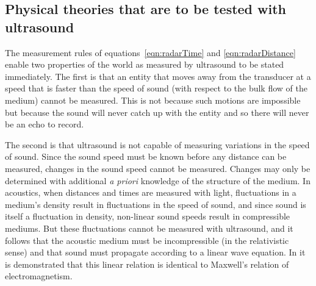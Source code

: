 \subsection{Physical theories  that are to be tested with ultrasound}

The measurement rules of equations~\ref{eqn:radarTime} and \ref{eqn:radarDistance} enable two properties of the world as measured by ultrasound to be stated immediately.
The first is that an entity that moves away from the transducer at a speed that is faster than the speed of sound (with respect to the bulk flow of the medium) 
cannot be measured.  
This is not because such motions are impossible but because the sound will never catch  up with the entity and so there will never be an echo to record.

The second is that ultrasound is not capable of  measuring variations in the speed of sound.
Since the sound speed must be known before any distance can be measured,
changes in the sound speed  cannot be measured. 
Changes may only be determined  with additional {\em a priori} knowledge of the structure of the medium. 
In acoustics, when distances and times are measured with light,
fluctuations in a medium's density result in fluctuations in the speed of sound,
and since sound is itself a fluctuation in density, 
non-linear sound speeds result in compressible mediums.
But these fluctuations cannot be measured with ultrasound,
and it follows that the acoustic medium must be incompressible (in the relativistic sense\cite{Pekeris1976, Pekeris1977, Taub1978})
and that  sound must propagate according to a linear wave equation. %
In  it is demonstrated that this linear relation is identical to Maxwell's relation of electromagnetism.

